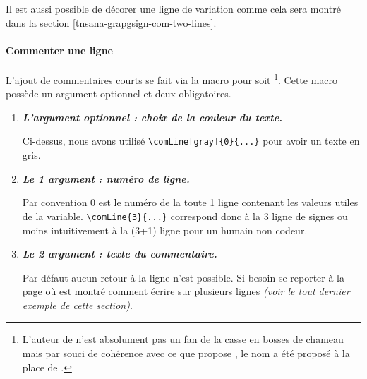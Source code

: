 \documentclass[12pt,a4paper]{article}
\begin{document}
\begin{remark}
	Il est aussi possible de décorer une ligne de variation comme cela sera montré dans la section \ref{tnsana-grapgsign-com-two-lines}. 
\end{remark}




\paragraph{Commenter une ligne}

L'ajout de commentaires courts se fait via la macro  pour  soit 
\footnote{
    L'auteur de  n'est absolument pas un fan de la casse en bosses de chameau mais par souci de cohérence avec ce que propose , le nom  a été proposé à la place de .
}.
Cette macro possède un argument optionnel et deux obligatoires.

\begin{enumerate}
    \item \textbf{\emph{L'argument optionnel : choix de la couleur du texte.}}
          
          \smallskip
          
          Ci-dessus, nous avons utilisé \verb#\comLine[gray]{0}{...}# pour avoir un texte en gris.


    \medskip
    \item \textbf{\emph{Le 1\ier{} argument : numéro de ligne.}}
          
          \smallskip
          
          Par convention $0$ est le numéro de la toute 1\iere{} ligne contenant les valeurs utiles de la variable.
          \verb#\comLine{3}{...}# correspond donc à la 3\ieme{} ligne de signes ou moins intuitivement à la (3+1)\ieme{} ligne pour un humain non codeur.

    \medskip
    \item \textbf{\emph{Le 2\ieme{} argument : texte du commentaire.}}
          
          \smallskip
          
          Par défaut aucun retour à la ligne n'est possible.
          Si besoin se reporter à la  page \pageref{tnsana-grapgsign-com-two-lines} où est montré comment écrire sur plusieurs lignes \emph{(voir le tout dernier exemple de cette section)}.
\end{enumerate}
\end{document}
